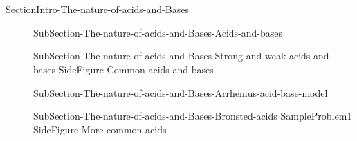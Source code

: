 \documentclass[main.tex]{subfiles}
\newcommand\chapterlabel{Ch-acidbase}\setcounter{figurenewcounter}{0}\setcounter{tablenewcounter}{0}\setcounter{formulanewcounter}{0}
\begin{document}
\section{\color{blue!30!black}{The nature of acids and Bases}}{SectionIntro-The-nature-of-acids-and-Bases}
\sloppy\begin{description}
\item[]  {SubSection-The-nature-of-acids-and-Bases-Acids-and-bases}
\item[] {SubSection-The-nature-of-acids-and-Bases-Strong-and-weak-acids-and-bases} 
{SideFigure-Common-acids-and-bases}
\item[] {SubSection-The-nature-of-acids-and-Bases-Arrhenius-acid-base-model}
\item[]{SubSection-The-nature-of-acids-and-Bases-Bronsted-acids}
{SampleProblem1}
{SideFigure-More-common-acids}
\end{description}
\end{document}
